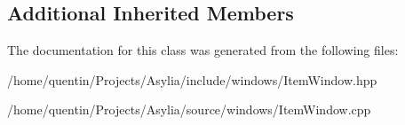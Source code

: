 \subsection*{Additional Inherited Members}


The documentation for this class was generated from the following files\-:\begin{DoxyCompactItemize}
\item 
/home/quentin/\-Projects/\-Asylia/include/windows/Item\-Window.\-hpp\item 
/home/quentin/\-Projects/\-Asylia/source/windows/Item\-Window.\-cpp\end{DoxyCompactItemize}
